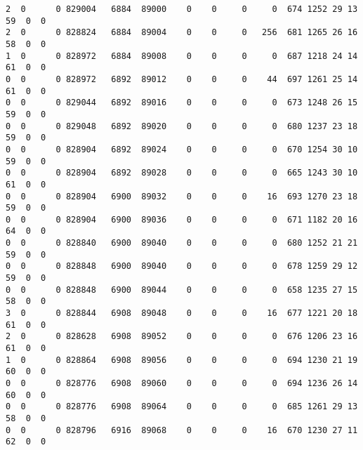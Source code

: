 \begin{lstlisting}[caption={Eerste 50 resultaten}, basicstyle=\footnotesize]
2  0      0 829004   6884  89000    0    0     0     0  674 1252 29 13 59  0  0
2  0      0 828824   6884  89004    0    0     0   256  681 1265 26 16 58  0  0
1  0      0 828972   6884  89008    0    0     0     0  687 1218 24 14 61  0  0
0  0      0 828972   6892  89012    0    0     0    44  697 1261 25 14 61  0  0
0  0      0 829044   6892  89016    0    0     0     0  673 1248 26 15 59  0  0
0  0      0 829048   6892  89020    0    0     0     0  680 1237 23 18 59  0  0
0  0      0 828904   6892  89024    0    0     0     0  670 1254 30 10 59  0  0
0  0      0 828904   6892  89028    0    0     0     0  665 1243 30 10 61  0  0
0  0      0 828904   6900  89032    0    0     0    16  693 1270 23 18 59  0  0
0  0      0 828904   6900  89036    0    0     0     0  671 1182 20 16 64  0  0
0  0      0 828840   6900  89040    0    0     0     0  680 1252 21 21 59  0  0
0  0      0 828848   6900  89040    0    0     0     0  678 1259 29 12 59  0  0
0  0      0 828848   6900  89044    0    0     0     0  658 1235 27 15 58  0  0
3  0      0 828844   6908  89048    0    0     0    16  677 1221 20 18 61  0  0
2  0      0 828628   6908  89052    0    0     0     0  676 1206 23 16 61  0  0
1  0      0 828864   6908  89056    0    0     0     0  694 1230 21 19 60  0  0
0  0      0 828776   6908  89060    0    0     0     0  694 1236 26 14 60  0  0
0  0      0 828776   6908  89064    0    0     0     0  685 1261 29 13 58  0  0
0  0      0 828796   6916  89068    0    0     0    16  670 1230 27 11 62  0  0

\end{lstlisting}




















